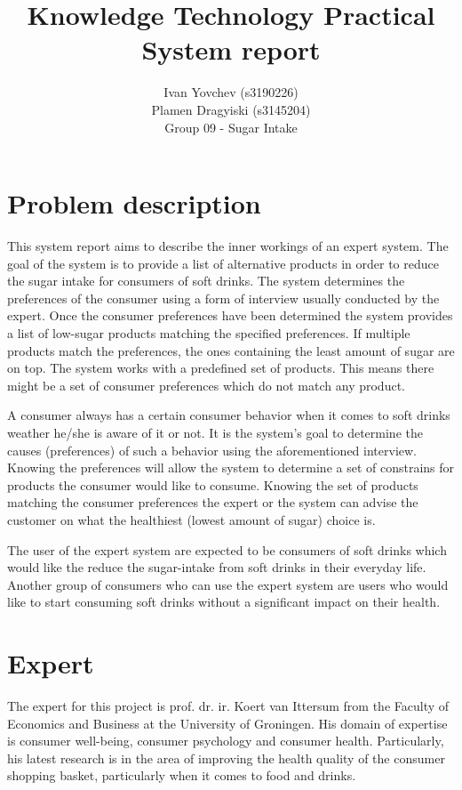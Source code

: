 \documentclass[11pt,a4paper]{article}
\title{Knowledge Technology Practical\\ System report}
\author{Ivan Yovchev (s3190226) \\
		Plamen Dragyiski (s3145204)\\
		Group 09 - Sugar Intake}
\begin{document}
\maketitle

\section{Problem description}

This system report aims to describe the inner workings of an expert system. The goal of the system is to provide a list of alternative products in order to reduce the sugar intake for consumers of soft drinks. The system determines the preferences of the consumer using a form of interview usually conducted by the expert. Once the consumer preferences have been determined the system provides a list of low-sugar products matching the specified preferences. If multiple products match the preferences, the ones containing the least amount of sugar are on top. The system works with a predefined set of products. This means there might be a set of consumer preferences which do not match any product.

A consumer always has a certain consumer behavior when it comes to soft drinks weather he/she is aware of it or not. It is the system's goal to determine the causes (preferences) of such a behavior using the aforementioned interview. Knowing the preferences will allow the system to determine a set of constrains for products the consumer would like to consume. Knowing the set of products matching the consumer preferences the expert or the system can advise the customer on what the healthiest (lowest amount of sugar) choice is.

The user of the expert system are expected to be consumers of soft drinks which would like the reduce the sugar-intake from soft drinks in their everyday life. Another group of consumers who can use the expert system are users who would like to start consuming soft drinks without a significant impact on their health.

\section{Expert}

The expert for this project is prof. dr. ir. Koert van Ittersum from the Faculty of Economics and Business at the University of Groningen. His domain of expertise is consumer well-being, consumer psychology and consumer health. Particularly, his latest research is in the area of improving the health quality of the consumer shopping basket, particularly when it comes to food and drinks.
\end{document}
